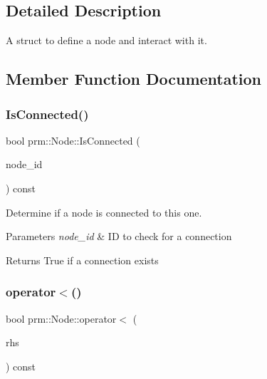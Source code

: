 \subsection{Detailed Description}
A struct to define a node and interact with it. 

\subsection{Member Function Documentation}
\mbox{\label{structprm_1_1Node_a166ab395f8fcb59f5d5367ca45f7bf51}} 
\subsubsection{\texorpdfstring{Is\+Connected()}{IsConnected()}}
{\footnotesize\ttfamily bool prm\+::\+Node\+::\+Is\+Connected (\begin{DoxyParamCaption}\item[{int}]{node\+\_\+id }\end{DoxyParamCaption}) const\hspace{0.3cm}{\ttfamily [inline]}}



Determine if a node is connected to this one. 


\begin{DoxyParams}{Parameters}
{\em node\+\_\+id} & ID to check for a connection \\
\hline
\end{DoxyParams}
\begin{DoxyReturn}{Returns}
True if a connection exists 
\end{DoxyReturn}
\mbox{\label{structprm_1_1Node_ad414f13a52664be229be3a594613fb45}} 
\subsubsection{\texorpdfstring{operator$<$()}{operator<()}}
{\footnotesize\ttfamily bool prm\+::\+Node\+::operator$<$ (\begin{DoxyParamCaption}\item[{const \hyperlink{structprm_1_1Node}{Node} \&}]{rhs }\end{DoxyParamCaption}) const\hspace{0.3cm}{\ttfamily [inline]}}



